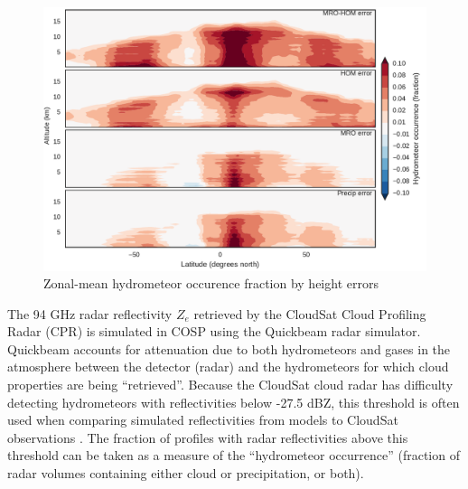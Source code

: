 \begin{figure}
\centering
\includegraphics[width=\columnwidth]{graphics/subgrid1_hfba_zonal_diff.pdf}
\caption{Zonal-mean hydrometeor occurence fraction by height errors}
\label{sg_hfba_zonal_diff}
\end{figure}

The 94 GHz radar reflectivity $Z_e$ retrieved by the CloudSat Cloud Profiling Radar (CPR) is simulated in COSP using the Quickbeam \citep{haynes_et_al_2007} radar simulator. Quickbeam accounts for attenuation due to both hydrometeors and gases in the atmosphere between the detector (radar) and the hydrometeors for which cloud properties are being ``retrieved''. Because the CloudSat cloud radar has difficulty detecting hydrometeors with reflectivities below -27.5 dBZ, this threshold is often used when comparing simulated reflectivities from models to CloudSat observations \citep{marchand_et_al_2009}. The fraction of profiles with radar reflectivities above this threshold can be taken as a measure of the ``hydrometeor occurrence'' (fraction of radar volumes containing either cloud or precipitation, or both). 

